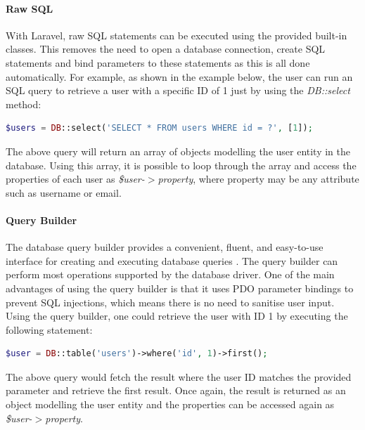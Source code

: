 \paragraph{Raw SQL}
With Laravel, raw SQL statements can be executed using the provided built-in classes. This removes the need to open a database connection, create SQL statements and bind parameters to these statements as this is all done automatically. For example, as shown in the example below, the user can run an SQL query to retrieve a user with a specific ID of 1 just by using the \emph{DB::select} method:

\begin{lstlisting}[language=php]
	$users = DB::select('SELECT * FROM users WHERE id = ?', [1]);
\end{lstlisting}

The above query will return an array of objects modelling the user entity in the database. Using this array, it is possible to loop through the array and access the properties of each user as \emph{\$user-$>$property}, where property may be any attribute such as username or email.

\paragraph{Query Builder}
The database query builder provides a convenient, fluent, and easy-to-use interface for creating and executing database queries \cite{Laravel:QueryBuilder}. The query builder can perform most operations supported by the database driver. One of the main advantages of using the query builder is that it uses PDO parameter bindings to prevent SQL injections, which means there is no need to sanitise user input. Using the query builder, one could retrieve the user with ID 1 by executing the following statement:

\begin{lstlisting}[language=php]
	$user = DB::table('users')->where('id', 1)->first();
\end{lstlisting}

The above query would fetch the result where the user ID matches the provided parameter and retrieve the first result. Once again, the result is returned as an object modelling the user entity and the properties can be accessed again as \emph{\$user-$>$property}.

